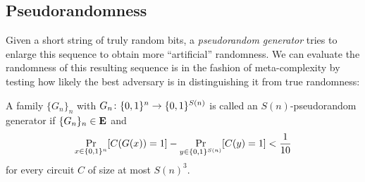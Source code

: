 \documentclass[11pt]{article}
\begin{document}


%   
%   
%
%   


\subsection{Pseudorandomness}

Given a short string of truly random bits, a \emph{pseudorandom
generator} tries to enlarge this sequence to obtain more
``artificial'' randomness.
We can evaluate the randomness of this resulting sequence is in the
fashion of meta-complexity by testing how likely the best adversary is in
distinguishing it from true randomness:

\begin{definition}
  A family $\{G_n\}_n$ with $G_n \colon \{0,1\}^n \to \{0,1\}^{S(n)}$ is called an
  $S(n)$-pseudorandom generator if $\{G_n\}_n \in \mathbf{E}$ and
  \[
    \Pr_{x \in \{0,1\}^n}[C(G(x)) = 1] -
    \Pr_{y \in \{0,1\}^{S(n)}}[C(y) = 1] < \frac 1 {10}
  \]
  for every circuit $C$ of size at most $S(n)^3$.
\end{definition}
\end{document}
